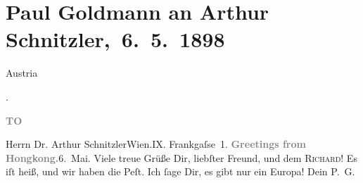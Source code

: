 

         
         \renewcommand{\erwaehntePersonen}{Personen: Richard Beer-Hofmann}
         \renewcommand{\erwaehnteOrte}{Orte: Europa, Frankgasse, Hong Kong, Wien, Österreich}
         \renewcommand{\erwaehnteWerke}{}
               \section[ Paul Goldmann an Arthur Schnitzler, 6. 5. 1898]{ Paul Goldmann an Arthur Schnitzler, 6. 5. 1898}\nopagebreak{}\rehead{ }\begin{ledgroupsized}[t]{13cm}\normalsize\beginnumbering \toendnotes[C]{\smallbreak\pagebreak[2]} 
\pstart{}{\pb}\begin{otherlanguage}{english}Austria\end{otherlanguage}.\pend{}\pstart{}\begin{otherlanguage}{english}\textcolor{gray}{\textbf{TO}}\end{otherlanguage}\pend{}\pstart{}Herrn Dr. Arthur Schnitzler\pend{}\pstart{}Wien.\pend{}\pstart{}IX. Frankgaſse 1.\pend{}{\bigskip}\pstart
           \noindent{}{\pb}\textcolor{gray}{\textbf{Greetings from Hongkong.}}\hfill 6. Mai.\pend
           \pstart
           Viele treue Grüße Dir, liebſter Freund, und dem \textsc{Richard}! Es iſt heiß, und wir haben die Peſt. Ich ſage Dir, es gibt nur ein Europa! Dein \spacefill\mbox{P. G.}\pend
           
         
         \endnumbering{}\end{ledgroupsized}  \newcommand{\dateiname}{L02852}\newcommand{\titel}{Paul Goldmann an Arthur Schnitzler, 6. 5. 1898}\newcommand{\editorInnen}{Martin Anton Müller und Laura Untner}
      